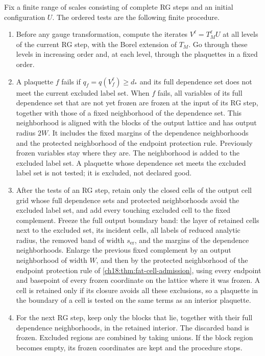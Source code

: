 \begin{definition}\label{ch18:def:ordered-tests}
Fix a finite range of scales consisting of complete RG steps and an initial configuration $U$. The ordered tests are the following finite procedure.
\begin{enumerate}
\item Before any gauge transformation, compute the iterates $V^\ell=T_M^\ell U$ at all levels of the current RG step, with the Borel extension of $T_M$. Go through these levels in increasing order and, at each level, through the plaquettes in a fixed order.
\item A plaquette $f$ fails if $q_f=q(V^\ell_f)\ge d_*$ and its full dependence set does not meet the current excluded label set. When $f$ fails, all variables of its full dependence set that are not yet frozen are frozen at the input of its RG step, together with those of a fixed neighborhood of the dependence set. This neighborhood is aligned with the blocks of the output lattice and has output radius $2W$. It includes the fixed margins of the dependence neighborhoods and the protected neighborhood of the endpoint protection rule. Previously frozen variables stay where they are. The neighborhood is added to the excluded label set. A plaquette whose dependence set meets the excluded label set is not tested; it is excluded, not declared good.
\item After the tests of an RG step, retain only the closed cells of the output cell grid whose full dependence sets and protected neighborhoods avoid the excluded label set, and add every touching excluded cell to the fixed complement. Freeze the full output boundary band: the layer of retained cells next to the excluded set, its incident cells, all labels of reduced analytic radius, the removed band of width $s_{\mathrm{er}}$, and the margins of the dependence neighborhoods. Enlarge the previous fixed complement by an output neighborhood of width $W$, and then by the protected neighborhood of the endpoint protection rule of \cref{ch18:thm:fat-cell-admission}, using every endpoint and basepoint of every frozen coordinate on the lattice where it was frozen. A cell is retained only if its closure avoids all these exclusions, so a plaquette in the boundary of a cell is tested on the same terms as an interior plaquette.
\item For the next RG step, keep only the blocks that lie, together with their full dependence neighborhoods, in the retained interior. The discarded band is frozen. Excluded regions are combined by taking unions. If the block region becomes empty, its frozen coordinates are kept and the procedure stops.

\end{enumerate}
\end{definition}
